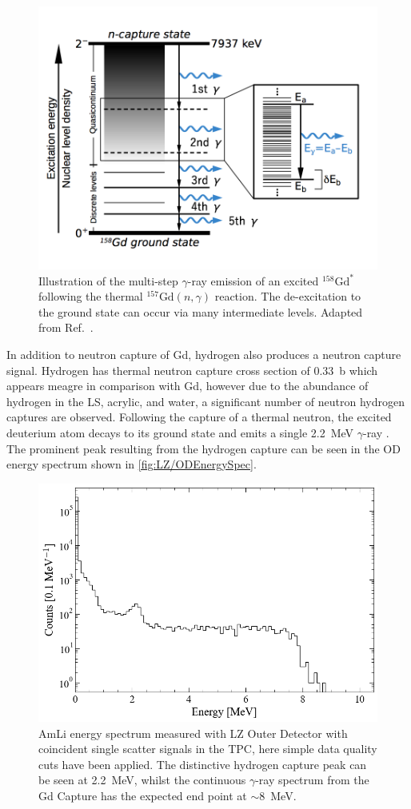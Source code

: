 \begin{figure}[!ht]
    \centering
    \includegraphics[width=0.7\linewidth]{figures/LZ/ContinuumEmission2.png}
    \caption{Illustration of the multi-step $\gamma$-ray emission of an excited $^{158}\text{Gd}^*$ following the thermal $^{157}\text{Gd}(n,\gamma)$ reaction. The de-excitation to the ground state can occur via many intermediate levels. Adapted from Ref.~\cite{Hagiwara:2018kmr}.}
    \label{fig:LZ/Gd158Deexcite}
\end{figure}
In addition to neutron capture of Gd, hydrogen also produces a neutron capture signal. Hydrogen has thermal neutron capture cross section of 0.33~b which appears meagre in comparison with Gd, however due to the abundance of hydrogen in the LS, acrylic, and water, a significant number of neutron hydrogen captures are observed. Following the capture of a thermal neutron, the excited deuterium atom decays to its ground state and emits a single 2.2~MeV $\gamma$-ray \cite{LZTDR}. The prominent peak resulting from the hydrogen capture can be seen in the OD energy spectrum shown in \autoref{fig:LZ/ODEnergySpec}.
\begin{figure}[!ht]
    \centering
    \includegraphics[width=0.7\linewidth]{figures/LZ/ODEnergySpec.png}
    \caption{AmLi energy spectrum measured with LZ Outer Detector with coincident single scatter signals in the TPC, here simple data quality cuts have been applied. The distinctive hydrogen capture peak can be seen at 2.2~MeV, whilst the continuous $\gamma$-ray spectrum from the Gd Capture has the expected end point at $\mathtt{\sim}$8~MeV.}
    \label{fig:LZ/ODEnergySpec}
\end{figure}
